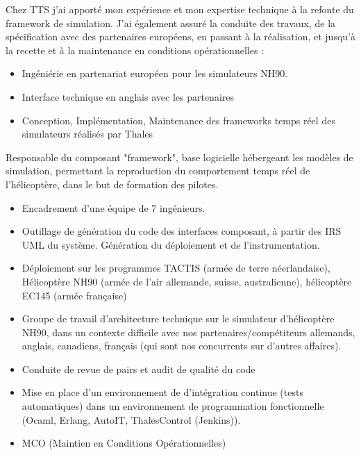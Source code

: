 {
Chez TTS j'ai apporté mon expérience et mon expertise technique à la refonte du framework de simulation. J'ai également assuré la conduite des travaux, de la spécification avec des partenaires européens, en passant à la réalisation, et jusqu'à la recette et à la maintenance en conditions opérationnelles :
\begin{itemize}
\item {Ingéniérie en partenariat européen pour les simulateurs NH90.}
\item {Interface technique en anglais avec les partenaires}
\item {Conception, Implémentation, Maintenance des frameworks temps réel des simulateurs réalisés par Thales}
\end{itemize}
\pagebreak
Responsable du composant "framework", base logicielle hébergeant les modèles de simulation, permettant la reproduction du comportement temps réel de l'hélicoptère, dans le but de formation des pilotes.
\begin{itemize}
\item{	Encadrement d’une équipe de 7 ingénieurs.}
\item{	Outillage de génération du code des interfaces composant, à partir des IRS UML du système. Génération du déploiement et de l’instrumentation.}
\item{Déploiement sur les programmes TACTIS (armée de terre néerlandaise), Hélicoptère NH90 (armée de l’air allemande, suisse, australienne), hélicoptère EC145 (armée française)}
\item{Groupe de travail d’architecture technique sur le simulateur d’hélicoptère NH90, dans un contexte difficile avec nos partenaires/compétiteurs allemands, anglais, canadiens, français (qui sont nos concurrents sur d’autres affaires).}
\item {Conduite de revue de pairs et audit de qualité du code}
\item {Mise en place d’un environnement de d’intégration continue (tests automatiques) dans un environnement de programmation fonctionnelle (Ocaml, Erlang, AutoIT, ThalesControl (Jenkins)).}
\item {MCO (Maintien en Conditions Opérationnelles)}
\end{itemize}
}
